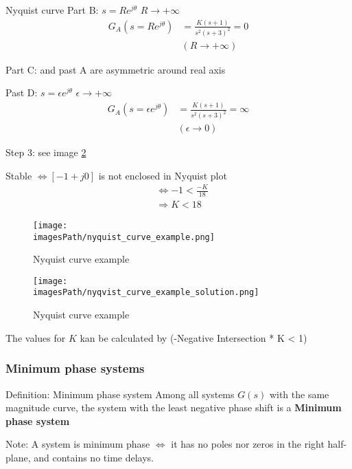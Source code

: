 \begin{exampleblock}{Nyquist curve}
    Part B: $s = Re^{j\theta}$ $R\to+\infty$
    \begin{align*}
       G_A(s=Re^{j\theta}) &= \frac{K(s+1)}{s^2(s+3)^2} = 0 \\
        &(R\to+\infty)
    \end{align*}

    Part C: and past A are asymmetric around real axis 

    Past D: $s=\epsilon e^{j\theta}$ $\epsilon\to+\infty$
    \begin{align*}
       G_A(s=\epsilon e^{j\theta}) &= \frac{K(s+1)}{s^2(s+3)^2} = \infty \\
        &(\epsilon\to0)
    \end{align*}

    Step 3: see image \ref{fig:nyquist_curve_example_solution}

    Stable $\Leftrightarrow [-1+j0]$ is not enclosed in Nyquist plot
    \begin{align*}
        &\Leftrightarrow -1 < \frac{-K}{18} \\
        &\Rightarrow K < 18
    \end{align*}
\end{exampleblock}

\begin{figure}[!h]
    \centering
    \texttt{[image: \\imagesPath/nyquist\_curve\_example.png]}
    \caption{Nyquist curve example}
    \label{fig:nyquist_curve_example_parts}
\end{figure}
\begin{figure}[!h]
    \centering
    \texttt{[image: \\imagesPath/nyqvist\_curve\_example\_solution.png]}
    \caption{Nyquist curve example}
    \label{fig:nyquist_curve_example_solution}
\end{figure}

The values for $K$ kan be calculated by (-Negative Intersection * K < 1)


\subsubsection{Minimum phase systems}
\begin{definitionblock}{Definition: Minimum phase system}
   Among all systems $G(s)$ with the same magnitude curve, the system with the 
   least negative phase shift is a \textbf{Minimum phase system} 
\end{definitionblock}
Note: A system is minimum phase $\Leftrightarrow$ it has no poles nor zeros in the 
right half-plane, and contains no time delays.

